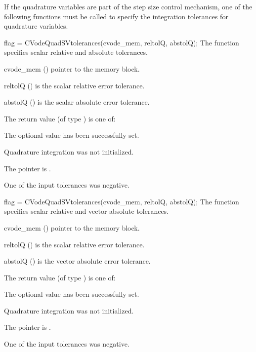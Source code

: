 If the quadrature variables are part of the step size control mechanism,
one of the following functions must be called to specify the
integration tolerances for quadrature variables.

{
 flag = CVodeQuadSVtolerances(cvode\_mem, reltolQ, abstolQ);
}
{
  The function  specifies scalar relative and absolute
  tolerances.
}
{
  \begin{args}
  \item[cvode\_mem] ()
    pointer to the {\cvodes} memory block.
  \item[reltolQ] ()
    is the scalar relative error tolerance.
  \item[abstolQ] ()
    is the scalar absolute error tolerance.
  \end{args}
}
{
  The return value  (of type ) is one of:
  \begin{args}
  \item[\Id{CV\_SUCCESS}]
    The optional value has been successfully set.
  \item[\Id{CV\_NO\_QUAD}]
    Quadrature integration was not initialized.
  \item[\Id{CV\_MEM\_NULL}]
    The  pointer is .
  \item[\Id{CV\_ILL\_INPUT}]
    One of the input tolerances was negative.
  \end{args}
}
{}

{
 flag = CVodeQuadSVtolerances(cvode\_mem, reltolQ, abstolQ);
}
{
  The function  specifies scalar relative and
  vector absolute tolerances.
}
{
  \begin{args}
  \item[cvode\_mem] ()
    pointer to the {\cvodes} memory block.
  \item[reltolQ] ()
    is the scalar relative error tolerance.
  \item[abstolQ] ()
    is the vector absolute error tolerance.
  \end{args}
}
{
  The return value  (of type ) is one of:
  \begin{args}
  \item[\Id{CV\_SUCCESS}]
    The optional value has been successfully set.
  \item[\Id{CV\_NO\_QUAD}]
    Quadrature integration was not initialized.
  \item[\Id{CV\_MEM\_NULL}]
    The  pointer is .
  \item[\Id{CV\_ILL\_INPUT}]
    One of the input tolerances was negative.
  \end{args}
}
{}

